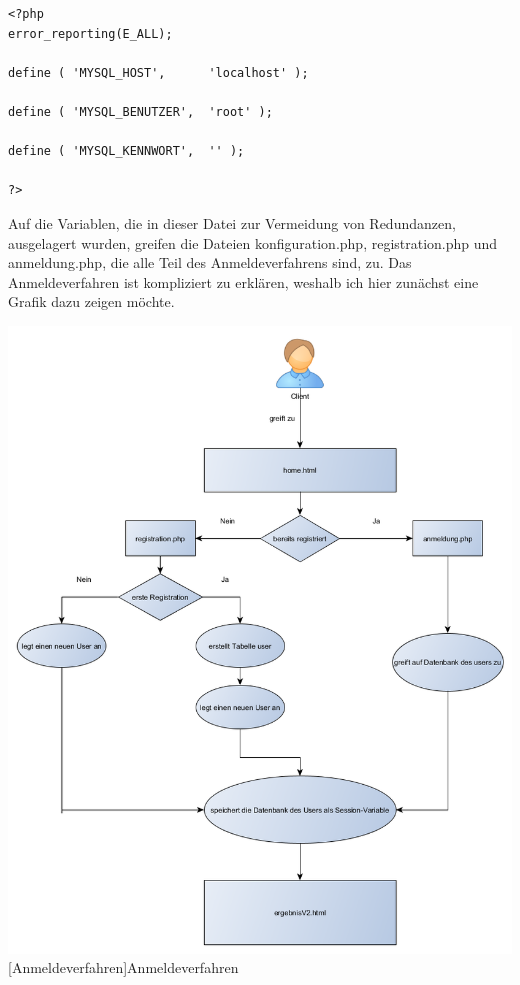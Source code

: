 \documentclass[12pt,a4paper,bibliography=totocnumbered,listof=totocnumbered]{scrartcl}
\begin{document}
\begin{minipage}{\linewidth}
\vspace{1em}
\begin{lstlisting}[caption= Ind.php, label=lst:ind.php]
<?php
error_reporting(E_ALL);
 
define ( 'MYSQL_HOST',      'localhost' );

define ( 'MYSQL_BENUTZER',  'root' );

define ( 'MYSQL_KENNWORT',  '' );

?>
\end{lstlisting}

Auf die Variablen, die in dieser Datei zur Vermeidung von Redundanzen, ausgelagert wurden, greifen die Dateien \glqq konfiguration.php\grqq, \glqq registration.php\grqq{} und \glqq anmeldung.php\grqq, die alle Teil des Anmeldeverfahrens sind, zu.
Das Anmeldeverfahren ist kompliziert zu erklären, weshalb ich hier zunächst eine Grafik dazu zeigen möchte.

\vspace{1em}
\begin{minipage}{\linewidth}
	\centering
	\includegraphics[width=1.0\linewidth]{Bilder/engine2-anmeldung.png}
	[Anmeldeverfahren]{Anmeldeverfahren}
	\label{fig:anmeldeverfahren}
\end{minipage}


\end{minipage}
\end{document}
